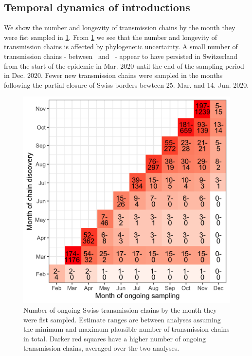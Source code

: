 \documentclass[9pt,twocolumn,twoside,lineno]{pnas-new}
\begin{document}
\subsection{Temporal dynamics of introductions}
We show the number and longevity of transmission chains by the month they were fist sampled in \ref{fig:chain-longevity}. From \ref{fig:chain-longevity} we see that the number and longevity of transmission chains is affected by phylogenetic uncertainty. A small number of transmission chains - between \nspanningchainsmax\ and \nspanningchainsmin\ - appear to have persisted in Switzerland from the start of the epidemic in Mar. 2020 until the end of the sampling period in Dec. 2020. Fewer new transmission chains were sampled in the months following the partial closure of Swiss borders bewteen 25. Mar. and 14. Jun. 2020. 
\begin{figure}[tbhp]
\centering
\includegraphics[width=.8\linewidth]{figures/chain_longevity_matrix.png}
\caption{Number of ongoing Swiss transmission chains by the month they were fist sampled. Estimate ranges are between analyses assuming the minimum and maximum plausible number of transmission chains in total. Darker red squares have a higher number of ongoing transmission chains, averaged over the two analyses.}
\label{fig:chain-longevity}
\end{figure}
\end{document}
